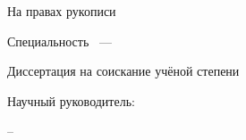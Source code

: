 
\thispagestyle{empty}

\begin{center}
\dissorg
\par
\end{center}

\vspace{20mm}
\begin{flushright}
На правах рукописи

{\sl \dissudk}
\end{flushright}

\vspace{30mm}
\begin{center}
{\large \dissauthor}
\end{center}

\vspace{5mm}
\begin{center}
{\bf \large \disstitle
\par}

\vspace{10mm}
{%
Специальность \specnum~---

\specname
}

\vspace{10mm}
Диссертация на соискание учёной степени

\edudegree
\end{center}

\vspace{20mm}
\begin{flushright}
Научный руководитель:

\mentordegree

\mentorname

\end{flushright}

\vspace{20mm}
\begin{center}
{\disscity -- \dissyear}
\end{center}

